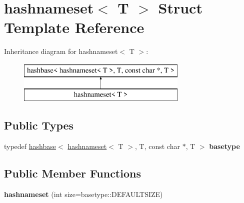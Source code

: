 \hypertarget{structhashnameset}{}\section{hashnameset$<$ T $>$ Struct Template Reference}
\label{structhashnameset}
Inheritance diagram for hashnameset$<$ T $>$\+:\begin{figure}[H]
\begin{center}
\leavevmode
\includegraphics[height=2.000000cm]{structhashnameset}
\end{center}
\end{figure}
\subsection*{Public Types}
\begin{DoxyCompactItemize}
\item 
\mbox{\label{structhashnameset_a637b59be44148940a0bd00183c43b8f8}} 
typedef \hyperlink{structhashbase}{hashbase}$<$ \hyperlink{structhashnameset}{hashnameset}$<$ T $>$, T, const char $\ast$, T $>$ {\bfseries basetype}
\end{DoxyCompactItemize}
\subsection*{Public Member Functions}
\begin{DoxyCompactItemize}
\item 
\mbox{\label{structhashnameset_a3a84c272e4e7e1052ae7ddfc2fc1a16e}} 
{\bfseries hashnameset} (int size=basetype\+::\+D\+E\+F\+A\+U\+L\+T\+S\+I\+ZE)
\end{DoxyCompactItemize}
